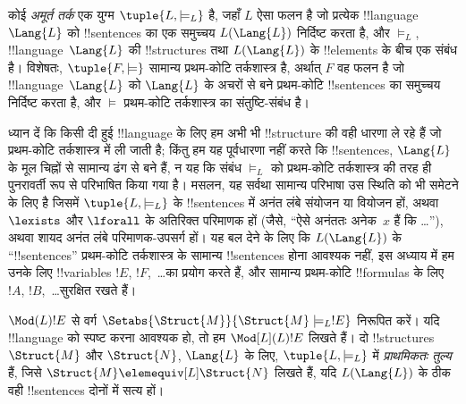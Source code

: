\documentclass[../../../include/open-logic-section]{subfiles}
\begin{document}

\begin{defn}
कोई \emph{अमूर्त तर्क} एक युग्म $\tuple{L, \models_L}$ है, जहाँ $L$ ऐसा
फलन है जो प्रत्येक !!{language}~$\Lang{L}$ को !!{sentence}s का एक समुच्चय
$L(\Lang{L})$ निर्दिष्ट करता है, और $\models_L$, !!{language}~$\Lang{L}$
की !!{structure}s तथा $L(\Lang{L})$ के !!{element}s के बीच एक संबंध है।
विशेषतः, $\tuple{F, \models}$ सामान्य प्रथम-कोटि तर्कशास्त्र है, अर्थात्
$F$ वह फलन है जो !!{language}~$\Lang{L}$ को $\Lang{L}$ के अचरों से बने
प्रथम-कोटि !!{sentence}s का समुच्चय निर्दिष्ट करता है, और $\models$
प्रथम-कोटि तर्कशास्त्र का संतुष्टि-संबंध है।
\end{defn}

ध्यान दें कि किसी दी हुई !!{language} के लिए हम अभी भी !!{structure} की
वही धारणा ले रहे हैं जो प्रथम-कोटि तर्कशास्त्र में ली जाती है; किंतु हम यह
पूर्वधारणा नहीं करते कि !!{sentence}s, $\Lang{L}$ के मूल चिह्नों से सामान्य
ढंग से बने हैं, न यह कि संबंध $\models_L$ को प्रथम-कोटि तर्कशास्त्र की तरह
ही पुनरावर्ती रूप से परिभाषित किया गया है। मसलन, यह सर्वथा सामान्य परिभाषा
उस स्थिति को भी समेटने के लिए है जिसमें $\tuple{L,\models_L}$ के
!!{sentence}s में अनंत लंबे संयोजन या वियोजन हों, अथवा $\lexists$ और
$\lforall$ के अतिरिक्त परिमाणक हों (जैसे, ``ऐसे अनंततः अनेक~$x$ हैं कि
\dots''), अथवा शायद अनंत लंबे परिमाणक-उपसर्ग हों। यह बल देने के लिए कि
$L(\Lang{L})$ के ``!!{sentence}s'' प्रथम-कोटि तर्कशास्त्र के सामान्य
!!{sentence}s होना आवश्यक नहीं, इस अध्याय में हम उनके लिए !!{variable}s
$!E$, $!F$,~\dots का प्रयोग करते हैं, और सामान्य प्रथम-कोटि !!{formula}s
के लिए $!A$, $!B$,~\dots सुरक्षित रखते हैं।

\begin{defn}
$\Mod(L){!E}$ से वर्ग $\Setabs{\Struct{M}}{\Struct{M}
  \models_L !E}$ निरूपित करें। यदि !!{language} को स्पष्ट करना आवश्यक हो,
तो हम $\Mod[L](L){!E}$ लिखते हैं। दो !!{structure}s $\Struct{M}$ और
$\Struct{N}$, $\Lang{L}$ के लिए, $\tuple{L, \models_L}$ में
\emph{प्राथमिकतः तुल्य} हैं, जिसे $\Struct{M} \elemequiv[L] \Struct{N}$ लिखते हैं, यदि $L(\Lang{L})$ के ठीक वही !!{sentence}s दोनों
में सत्य हों।
\end{defn}
\end{document}
